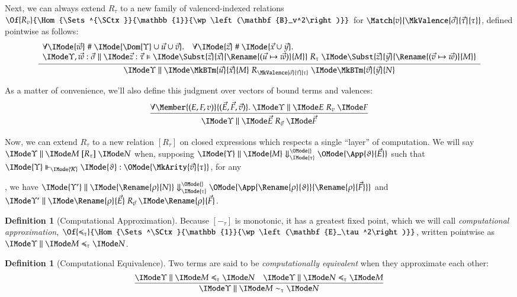 \documentclass[11pt]{article}
\theoremstyle{definition}
\newtheorem{definition}[thm]{Definition}
\theoremstyle{notation}
\theoremstyle{remark}
\numberwithin{equation}{section}
\newcommand\Pow[1]{\wp\left(#1\right)}
\newcommand\CanOperators{\mathcal{K}}
\newcommand\EvalN[5]{\IMode{#1}\parallel\IMode{#4}\Downarrow^{\OMode{#3}}_{\IMode{#2}}\OMode{#5}}
\newcommand\Eval[4]{\EvalN{#1}{#2}{}{#3}{#4}}
\newcommand\Exprs{\mathbf{E}}
\newcommand\BTms{\mathbf{B}}
\begin{document}
Next, we can always extend $R_\tau$ to a new
family of valenced-indexed relations
$\Of{R_v}{\Hom{\Sets^{\SCtx}}{\mathbb{1}}{\Pow{\BTms_v^2}}}$ for
$\Match{v}{\MkValence{\vec{\sigma}}{\vec{\tau}}{\tau}}$, defined pointwise as
follows:
\[
  \infer{
    \SBinRel{R_{\MkValence{\vec{\sigma}}{\vec{\tau}}{\tau}}}{\Upsilon}{
      \MkBTm{\vec{u}}{\vec{x}}{M}
    }{
      \MkBTm{\vec{v}}{\vec{y}}{N}
    }
  }{
    \begin{array}{l}
      \forall\IMode{\vec{w}}\mathrel{\#}\IMode{\Dom{\Upsilon}\cup\vec{u}\cup\vec{v}}.\quad
      \forall\IMode{\vec{z}}\mathrel{\#}\IMode{\vec{x}\cup\vec{y}}.\\
      \OSBinRel{R_\tau}{\Upsilon,\vec{w}:\vec{\sigma}}{\vec{z}:\vec{\tau}}{
        \Subst{\vec{z}}{\vec{x}}{
          \Rename{(\vec{u}\mapsto\vec{w})}{M}
        }
      }{
        \Subst{\vec{z}}{\vec{y}}{
          \Rename{(\vec{v}\mapsto\vec{w})}{M}
        }
      }
    \end{array}
  }
\]


As a matter of convenience, we'll also define this judgment over vectors of
bound terms and valences:
\[
  \infer{
    \SBinRel{R_{\vec{v}}}{\Upsilon}{\vec{E}}{\vec{F}}
  }{
    \forall\Member{(E,F,v)}{(\vec{E},\vec{F},\vec{v})}.\
    \SBinRel{R_v}{\Upsilon}{E}{F}
  }
\]

Now, we can extend $R_\tau$ to a new relation $[R_\tau]$ on closed expressions
which respects a single ``layer'' of computation. We will say
$\SBinRel{[R_\tau]}{\Upsilon}{M}{N}$ when, supposing
$\Eval{\Upsilon}{\tau}{M}{\App{\vartheta}{\Vec{E}}}$ such that
$\IMode{\Upsilon}\Vdash_{\IMode{\CanOperators}}\IMode{\vartheta}:\OMode{\MkArity{\vec{v}}{\tau}}$,
for any
, we have $\Eval{\Upsilon'}{\tau}{\Rename{\rho}{N}}{\App{\Rename{\rho}{\vartheta}}{\Rename{\rho}{\Vec{F}}}}$ and
$\SBinRel{R_{\vec{v}}}{\Upsilon'}{\Rename{\rho}{\vec{E}}}{\Rename{\rho}{\vec{F}}}$.

\begin{definition}[Computational Approximation]
Because $[-_\tau]$ is monotonic, it has a greatest fixed point, which we will
call \emph{computational approximation},
$\Of{\preccurlyeq_\tau}{\Hom{\Sets^\SCtx}{\mathbb{1}}{\Pow{\Exprs_\tau^2}}}$,
written pointwise as $\SBinRel{\preccurlyeq_\tau}{\Upsilon}{M}{N}$.
\end{definition}

\begin{definition}[Computational Equivalence]
  Two terms are said to be \emph{computationally equivalent} when they approximate each other:
  \[
    \infer{
      \SBinRel{\sim_\tau}{\Upsilon}{M}{N}
    }{
      \SBinRel{\preccurlyeq_\tau}{\Upsilon}{M}{N} &
      \SBinRel{\preccurlyeq_\tau}{\Upsilon}{N}{M}
    }
  \]
\end{definition}
\end{document}
